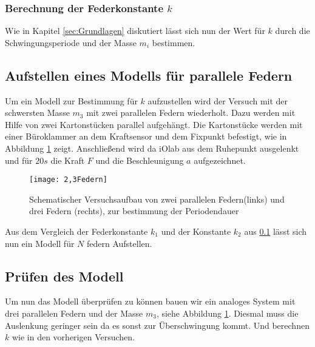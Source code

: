\subsubsection{Berechnung der Federkonstante $k$}
Wie in Kapitel \ref{sec:Grundlagen} diskutiert lässt sich nun der Wert für $k$ durch die Schwingungsperiode und der Masse $m_i$ bestimmen.
\subsection{Aufstellen eines Modells für parallele Federn}
\label{sec:Modell}
Um ein Modell zur Bestimmung für $k$ aufzustellen wird der Versuch mit der schwersten  Masse $m_3$ mit zwei parallelen Federn wiederholt. Dazu werden mit Hilfe von zwei Kartonstücken parallel aufgehängt. Die Kartonstücke werden mit einer Büroklammer an dem Kraftsensor und dem Fixpunkt befestigt, wie in Abbildung \ref{fig:2,3 Federn} zeigt. Anschließend wird da iOlab aus dem Ruhepunkt ausgelenkt und für $20s$ die Kraft $F$ und die Beschleunigung $a$ aufgezeichnet.
\begin{figure}[htb!]
	\centering
	\texttt{[image: 2,3Federn]}
	\caption{\label{fig:2,3 Federn} Schematischer Versuchsaufbau von zwei parallelen Federn(links) und drei Federn (rechts), zur bestimmung der Periodendauer}
\end{figure}
Aus dem Vergleich der Federkonstante $k_1$ und der Konstante $k_2$ aus \ref{sec:Modell} lässt sich nun ein Modell für $N$ federn Aufstellen.
\subsection{Prüfen des Modell}
Um nun das Modell überprüfen zu können bauen wir ein analoges System mit drei parallelen Federn und der Masse $m_3$, siehe Abbildung \ref{fig:2,3 Federn}. Diesmal muss die Auslenkung geringer sein da es sonst zur Überschwingung kommt. Und berechnen $k$ wie in den vorherigen Versuchen.